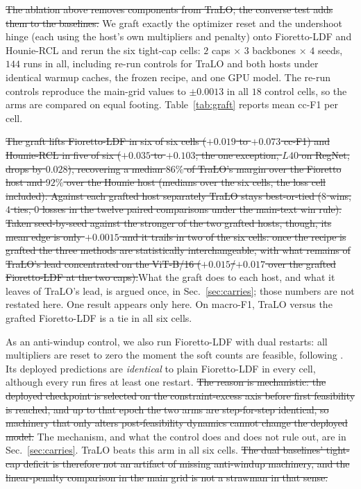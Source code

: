\documentclass[10pt]{article}
\newcommand{\del}[1]{{\color{red}\sout{#1}}}
\begin{document}
\del{The ablation above removes components from TraLO; the converse test adds
them to the baselines.} We graft exactly the optimizer reset and the
undershoot hinge (each using the host's own multipliers and penalty)
onto Fioretto-LDF and Hounie-RCL and rerun the six tight-cap cells:
$2$ caps $\times$ $3$ backbones $\times$ $4$ seeds, $144$ runs in all,
including re-run controls for TraLO and both hosts under identical
warmup caches, the frozen recipe, and one GPU model. The re-run
controls reproduce the main-grid values to $\pm0.0013$ in all $18$
control cells, so the arms are compared on equal footing.
Table~\ref{tab:graft} reports mean cc-F1 per cell.

\del{The graft lifts Fioretto-LDF in six of six cells ($+0.019$ to $+0.073$
cc-F1) and Hounie-RCL in five of six ($+0.035$ to $+0.103$; the one
exception, $L40$ on RegNet}{\color{blue}\del{Y-400MF}}\del{, drops by $0.028$), recovering a median
$86\%$ of TraLO's margin over the Fioretto host and $92\%$ over the
Hounie host (medians over the six cells, the loss cell included).
Against each grafted host separately TraLO stays best-or-tied ($8$
wins, $4$ ties, $0$ losses in the twelve paired comparisons under the
main-text win rule). Taken seed-by-seed against the stronger of the two
grafted hosts, though, its mean edge is only $+0.0015$ and it trails in
two of the six cells: once the recipe is grafted the three methods are
statistically interchangeable, with what remains of TraLO's lead
concentrated on the ViT-B/16 ($+0.015$/$+0.017$ over the grafted
Fioretto-LDF at the two caps).}{\color{blue}What the graft does to each host,
and what it leaves of TraLO's lead, is argued once, in Sec.~\ref{sec:carries};
those numbers are not restated here. One result appears only here.}
On macro-F1, TraLO versus the grafted
Fioretto-LDF is a tie in all six cells.

As an anti-windup control, we also run Fioretto-LDF with dual restarts:
all multipliers are reset to zero the moment the soft counts are
feasible, following \citet{gallego2022controlled}. Its deployed
predictions are \emph{identical} to plain Fioretto-LDF in every cell,
although every run fires at least one restart. \del{The reason is
mechanistic: the deployed checkpoint is selected on the
constraint-excess axis before first feasibility is reached, and up to
that epoch the two arms are step-for-step identical, so machinery that
only alters post-feasibility dynamics cannot change the deployed model.}%
{\color{blue}The mechanism, and what the control does and does not rule out,
are in Sec.~\ref{sec:carries}.}
TraLO beats this arm in all six cells. \del{The dual baselines' tight-cap
deficit is therefore not an artifact of missing anti-windup machinery,
and the linear-penalty comparison in the main grid is not a strawman in
that sense.}
\end{document}

